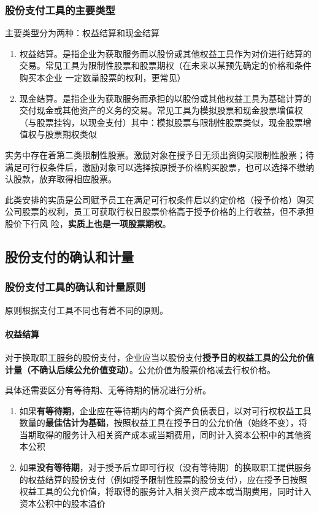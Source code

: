 \documentclass[UTF8,12pt]{ctexart}
\numberwithin{equation}{section} %
\numberwithin{figure}{section}
\numberwithin{table}{section}
\begin{document}
	
	\subsubsection{股份支付工具的主要类型}
	
	主要类型分为两种：权益结算和现金结算
	\begin{enumerate}
		\item 权益结算。是指企业为获取服务而以股份或其他权益工具作为对价进行结算的交易。常见工具为限制性股票和股票期权（在未来以某预先确定的价格和条件购买本企业  一定数量股票的权利，更常见）
		
		\item 现金结算。是指企业为获取服务而承担的以股份或其他权益工具为基础计算的交付现金或其他资产的义务的交易。常见工具为模拟股票和现金股票增值权（与股票挂钩，以现金支付）其中：模拟股票与限制性股票类似，现金股票增值权与股票期权类似
		
	\end{enumerate}
	
	实务中存在着第二类限制性股票。激励对象在授予日无须出资购买限制性股票；待满足可行权条件后，激励对象可以选择按原授予价格购买股票，也可以选择不缴纳认股款，放弃取得相应股票。
	
	此类安排的实质是公司赋予员工在满足可行权条件后以约定价格（授予价格）购买公司股票的权利，员工可获取行权日股票价格高于授予价格的上行收益，但不承担股价下行风 险，\textbf{实质上也是一项股票期权}。
	
	
	\subsection{股份支付的确认和计量}
	
	\subsubsection{股份支付工具的确认和计量原则}
	原则根据支付工具不同也有着不同的原则。
	
	\paragraph{权益结算}对于换取职工服务的股份支付，企业应当以股份支付\textbf{授予日的权益工具的公允价值计量（不确认后续公允价值变动）}。公允价值为股票价格减去行权价格。
	
	具体还需要区分有等待期、无等待期的情况进行分析。
	
	\begin{enumerate}
		\item 如果\textbf{有等待期}，企业应在等待期内的每个资产负债表日，以对可行权权益工具数量的\textbf{最佳估计为基础}，按照权益工具在授予日的公允价值（始终不变），将当期取得的服务计入相关资产成本或当期费用，同时计入资本公积中的其他资本公积
		
		\item 如果\textbf{没有等待期}，对于授予后立即可行权（没有等待期）的换取职工提供服务的权益结算的股份支付（例如授予限制性股票的股份支付），应在授予日按照权益工具的公允价值，将取得的服务计入相关资产成本或当期费用，同时计入资本公积中的股本溢价
	\end{enumerate}
	
\end{document}
